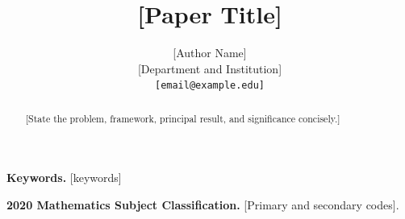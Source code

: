 \documentclass{article}
\title{[Paper Title]}
\author{[Author Name]\\
\small [Department and Institution]\\
\small \texttt{[email@example.edu]}}
\date{}
\numberwithin{equation}{section}
\theoremstyle{definition}
\theoremstyle{remark}
\begin{document}
\maketitle

\begin{abstract}
[State the problem, framework, principal result, and significance concisely.]
\end{abstract}

\noindent\textbf{Keywords.}
[keywords]\par
\smallskip
\noindent\textbf{2020 Mathematics Subject Classification.}
[Primary and secondary codes].







\ifdefined\submitversion
\else
  \appendix
  
\fi


\end{document}

